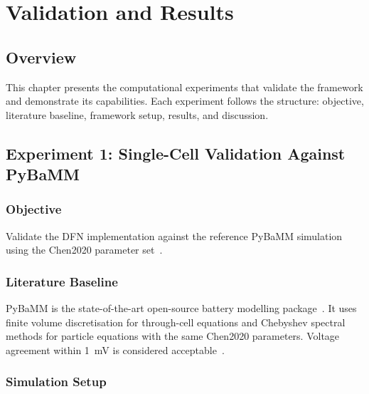 \chapter{Validation and Results}
\label{ch:results}

\section{Overview}

This chapter presents the computational experiments that validate the framework and demonstrate its capabilities. Each experiment follows the structure: objective, literature baseline, framework setup, results, and discussion.

\section{Experiment 1: Single-Cell Validation Against PyBaMM}
\label{sec:exp1}

\subsection{Objective}

Validate the \VIBE{} DFN implementation against the reference PyBaMM simulation using the Chen2020 parameter set~\cite{Chen2020,Sulzer2021}.

\subsection{Literature Baseline}

PyBaMM is the state-of-the-art open-source battery modelling package~\cite{Sulzer2021}. It uses finite volume discretisation for through-cell equations and Chebyshev spectral methods for particle equations with the same Chen2020 parameters. Voltage agreement within 1~mV is considered acceptable~\cite{Chen2020}.

\subsection{Simulation Setup}

